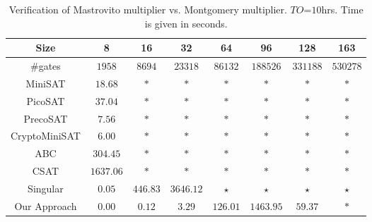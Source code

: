 \begin{table}[h!]
\begin{center}
\caption{\small Verification of Mastrovito multiplier vs. Montgomery multiplier. $TO$=$10$hrs. Time is given in seconds.}
\label{tab:masvsmont}
\begin{tabular}{|c||c|c|c|c|c|c|c|} \hline 
Size   			&8  		&16       	&32       	&64       	&96      	&128		&163	\\
\hline 
\#gates 		&$1958$  	&$8694$    	&$23318$   	&$86132$   	&$188526$ 	&$331188$ 	&$530278$ \\
\hline
MiniSAT   		&$18.68$  	&$\ast$   	&$\ast$  	&$\ast$    	&$\ast$ 	&$\ast$		&$\ast$ \\
\hline
PicoSAT   		&$37.04$  	&$\ast$   	&$\ast$  	&$\ast$    	&$\ast$ 	&$\ast$		&$\ast$ \\
\hline
PrecoSAT   		&$7.56$  	&$\ast$   	&$\ast$  	&$\ast$    	&$\ast$ 	&$\ast$		&$\ast$ \\
\hline
CryptoMiniSAT	&$6.00$  	&$\ast$   	&$\ast$  	&$\ast$    	&$\ast$ 	&$\ast$		&$\ast$ \\
\hline
ABC   			&$304.45$  	&$\ast$   	&$\ast$  	&$\ast$    	&$\ast$  	&$\ast$		&$\ast$ \\
\hline
CSAT   			&$1637.06$  &$\ast$   	&$\ast$  	&$\ast$    	&$\ast$  	&$\ast$		&$\ast$  \\
\hline
Singular		&$0.05$  	&$446.83$   &$3646.12$  &$\star$   	&$\star$ 	&$\star$ 	&$\star$	\\
\hline
\hline
Our Approach	&$0.00$  	&$0.12$   	&$3.29$  	&$126.01$  &$1463.95$  &$59.37$		&$\ast$ \\
\hline
\end{tabular}
\end{center}
\vspace{-0.2in}
\end{table}

